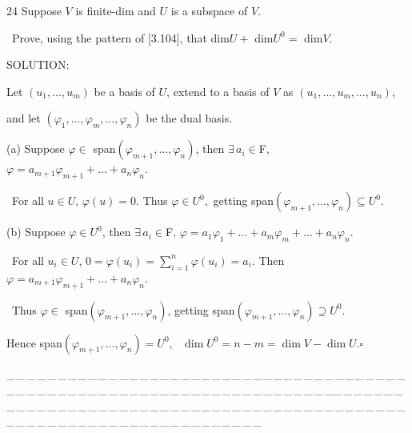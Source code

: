 \documentclass[a4paper, 11pt, UTF8]{article}
\begin{document}
\begin{large}
{\timesbf\Large 24} {\timessl\Large Suppose $V$ is finite-dim and $U$ is a subspace of $V$.}\par\quad\,
{\timessl\Large Prove, using the pattern of [3.104], that dim$U+$ dim$U^0=$ dim$V$.}\par
{\timesbf S{\small OLUTION}:}\par\quad
Let $(u_1,\dots,u_m)$ be a basis of $U$, extend to a basis of $V$ as $(u_1,\dots,u_m,\dots,u_n)$,\par\quad
and let $(\varphi_1,\dots,\varphi_m,\dots,\varphi_n)$ be the dual basis.\par\qquad
(a) Suppose $\varphi\in$ span$(\varphi_{m+1},\dots,\varphi_n)$, then $\exists\,a_i\in${\timesbf F}, $\varphi=a_{m+1}\varphi_{m+1}+\dots+a_n\varphi_n.$\par\quad\quad\quad\,
For all $u\in U$, $\varphi(u)=0$. Thus $\varphi\in U^0,$ getting span$(\varphi_{m+1},\dots,\varphi_n)\subseteq U^0.$\par\qquad
(b) Suppose $\varphi\in U^0$, then $\exists\,a_i\in${\timesbf F}, $\varphi=a_{1}\varphi_{1}+\dots+a_{m}\varphi_{m}+\dots+a_n\varphi_n.$\par\quad\quad\quad\,
For all $u_i\in U$, $0=\varphi(u_i)=\sum\limits_{i=1}^n \varphi(u_i)=a_i$. Then $\varphi=a_{m+1}\varphi_{m+1}+\dots+a_n\varphi_n.$\par\quad\quad\quad\,
Thus $\varphi\in$ span$(\varphi_{m+1},\dots,\varphi_n)$, getting span$(\varphi_{m+1},\dots,\varphi_n)\supseteq U^0.$\par\quad
Hence span$(\varphi_{m+1},\dots,\varphi_n)=U^0,\,\,\,\,\dim U^0=n-m=\dim V-\dim U$.\qquad\qquad\qquad\qquad$\square$\par
{\tiny \_\,\_\,\_\,\_\,\_\,\_\,\_\,\_\,\_\,\_\,\_\,\_\,\_\,\_\,\_\,\_\,\_\,\_\,\_\,\_\,\_\,\_\,\_\,\_\,\_\,\_\,\_\,\_\,\_\,\_\,\_\,\_\,\_\,\_\,\_\,\_\,\_\,\_\,\_\,\_\,\_\,\_\,\_\,\_\,\_\,\_\,\_\,\_\,\_\,\_\,\_\,\_\,\_\,\_\,\_\,\_\,\_\,\_\,\_\,\_\,\_\,\_\,\_\,\_\,\_\,\_\,\_\,\_\,\_\,\_\,\_\_\,\_\,\_\,\_\,\_\,\_\,\_\,\_\,\_\,\_\,\_\,\_\,\_\,\_\,\_\,\_\,\_\,\_\,\_\,\_\,\_\,\_\,\_\,\_\,\_\,\_\,\_\,\_\,\_\,\_\,\_\,\_\,\_\,\_\,\_\,\_\,\_\,\_\,\_\,\_\,\_\,\_\,\_\,\_\,\_\,\_\,\_\,\_\,\_\,\_\,\_\,\_\,\_\,\_\,\_\,\_\,\_\,\_\,\_\,\_\,\_\,\_\,\_\,\_\,\_\,\_\,\_\,\_\,\_\,\_\,\_}\par


\end{large}
\end{document}
